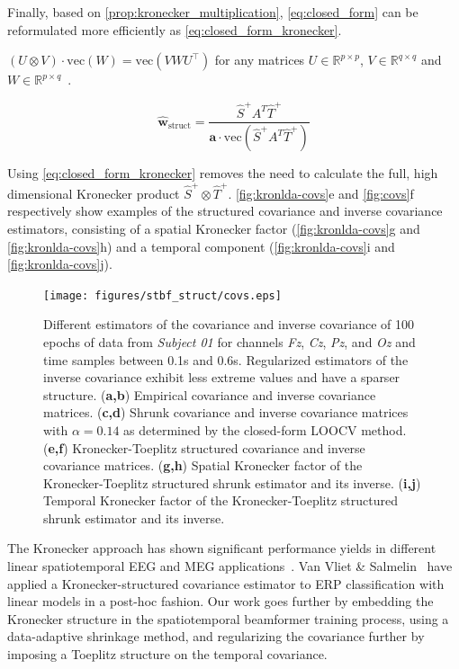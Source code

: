 	Finally, based on \autoref{prop:kronecker_multiplication},
	\autoref{eq:closed_form} can be reformulated more efficiently as
	\autoref{eq:closed_form_kronecker}.
	\begin{property}
		$(U\otimes V)\cdot\text{vec}(W) = \text{vec}(VWU^\intercal)$
		for any matrices $U\in\mathbb{R}^{p\times p}$,
		$V\in\mathbb{R}^{q\times q}$ and $W\in\mathbb{R}^{p\times q}$~\cite{Loan2000}.
		\label{prop:kronecker_multiplication}
	\end{property}

	\begin{equation}
		\hat{\mathbf{w}}_\text{struct} =
		\frac{\hat{S}^+A^T\hat{T}^+}
		{\mathbf{a}\cdot\text{vec}(\hat{S}^+A^T\hat{T}^+)}
		\label{eq:closed_form_kronecker}
	\end{equation}

	Using \autoref{eq:closed_form_kronecker} removes the need to calculate the full, high dimensional Kronecker product $\hat{S}^+\otimes
		\hat{T}^+$.
	\autoref{fig:kronlda-covs}e and \autoref{fig:covs}f respectively show examples of the
	structured covariance and inverse covariance estimators,
	consisting of a spatial Kronecker factor (\autoref{fig:kronlda-covs}g and
	\autoref{fig:kronlda-covs}h) and a temporal component (\autoref{fig:kronlda-covs}i and
	\autoref{fig:kronlda-covs}j).

	\begin{figure}
		\texttt{[image: figures/stbf\_struct/covs.eps]}
    \caption[Estimated covariance and inverse covariance.]{Different estimators of the covariance and inverse covariance
			of 100 epochs of data from \textit{Subject 01} for channels
			\textit{Fz}, \textit{Cz}, \textit{Pz}, and \textit{Oz} and time samples between 0.1s and 0.6s.
			Regularized estimators of the inverse covariance exhibit less extreme values and have a sparser structure.
			(\textbf{a,b}) Empirical covariance and inverse covariance matrices.
			(\textbf{c,d}) Shrunk covariance and inverse covariance matrices with $\alpha=0.14$ as
			determined by the closed-form LOOCV method. (\textbf{e,f}) Kronecker-Toeplitz
			structured covariance and inverse covariance matrices.
			(\textbf{g,h}) Spatial Kronecker factor of the Kronecker-Toeplitz structured shrunk estimator and its inverse.
			(\textbf{i,j}) Temporal Kronecker factor of the Kronecker-Toeplitz structured shrunk estimator and its inverse.}
		\label{fig:kronlda-covs}
	\end{figure}

	The Kronecker approach has shown significant performance yields in different linear spatiotemporal EEG and MEG
	applications~\cite{DeMunck2002,Huizenga2002,Beltrachini2013,GonzalezNavarro2016,GonzalezNavarro2017}.
	Van Vliet \& Salmelin~\cite{Vliet2020} have applied a Kronecker-structured covariance estimator to ERP classification with linear models in a post-hoc fashion.
	Our work goes further by embedding the Kronecker structure in the
	spatiotemporal beamformer training process, using a data-adaptive shrinkage
	method, and regularizing the covariance further by imposing a Toeplitz
	structure on the temporal covariance.

